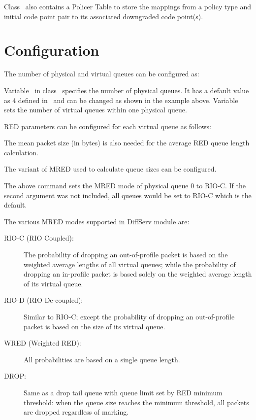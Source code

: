 Class~ also contains a Policer Table to 
  store the mappings from a policy type and initial code point pair to 
  its associated downgraded code point(s).  

\section{Configuration}
\label{sec:diffservconfig}

The number of physical and virtual queues can be configured as:



Variable~ in class~
  specifies the number of physical queues.
It has a default value as 4 defined in~ 
  and can be changed as shown in the example above.
Variable~ sets the number of virtual queues
  within one physical queue.

RED parameters can be configured for each virtual queue as follows:


The mean packet size (in bytes) is also needed for 
  the average RED queue length calculation.


The variant of MRED used to calculate queue sizes can be configured.


The above command sets the MRED mode of physical queue 0 to RIO-C. 
If the second argument was not included, 
  all queues would be set to RIO-C 
  which is the default. 

The various MRED modes supported in DiffServ module are:
\begin{description}
\item [RIO-C (RIO Coupled):] 
The probability of dropping an out-of-profile packet is based on 
  the weighted average lengths of all virtual queues; 
  while the probability of dropping an in-profile packet is based solely on 
  the weighted average length of its virtual queue.

\item [RIO-D (RIO De-coupled):] 
Similar to RIO-C; 
  except the probability of dropping an out-of-profile packet is based on 
  the size of its virtual queue.

\item [WRED (Weighted RED):] 
All probabilities are based on a single queue length. 

\item [DROP:] 
Same as a drop tail queue with queue limit set by RED minimum threshold: 
  when the queue size reaches the minimum threshold, 
  all packets are dropped regardless of marking.
\end{description}


